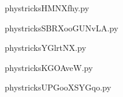     

    \clearpage
    


    \newcommand{\CaptionFigHMNXfhy}{<+Type your caption here+>}
    \begin{center}
        
    \end{center}
    phystricksHMNXfhy.py

    

    \clearpage
    


    \newcommand{\CaptionFigSBRXooGUNvLA}{<+Type your caption here+>}
    \begin{center}
        
    \end{center}
    phystricksSBRXooGUNvLA.py

    

    \clearpage
    


    \newcommand{\CaptionFigYGlrtNX}{<+Type your caption here+>}
    \begin{center}
        
    \end{center}
    phystricksYGlrtNX.py

    

    \clearpage
    


    \newcommand{\CaptionFigKGOAveW}{<+Type your caption here+>}
    \begin{center}
        
    \end{center}
    phystricksKGOAveW.py

    

    \clearpage
    


    \newcommand{\CaptionFigUPGooXSYGqo}{<+Type your caption here+>}
    \begin{center}
        
    \end{center}
    phystricksUPGooXSYGqo.py

    

    \clearpage
    


